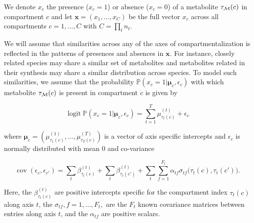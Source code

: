 \documentclass[
11pt, %
oneside, %
english, %
singlespacing, %
headsepline, %
chapterinoneline, %
]{MastersDoctoralThesis} %
\DeclareMathOperator{\logit}{logit}
\DeclareMathOperator{\cov}{cov}
\def\P{\mathbb{P}}
\def\x{\boldsymbol{x}}
\def\bmu{\boldsymbol{\mu}}
\def\M{{\cal M}}
\begin{document}
We denote $x_{c}$ the presence ($x_c=1$) or absence ($x_c=0$) of a metabolite $\tau_\M(c)$ in compartment $c$ and let $\x=(x_1, \ldots, x_C)$ be the full vector $x_c$ across all compartments $c=1, \ldots, C$ with $C=\prod_t n_t$.

We will assume that similarities across any of the axes of compartmentalization is reflected in the patterns of presences and absences in $\x$. For instance, closely related species may share a similar set of metabolites and  metabolites related in their synthesis may share a similar distribution across species. To model such similarities, we assume that the probability $\P(x_c=1|\bmu_c, \epsilon_c)$ with which metabolite $\tau_\M(c)$ is present in compartment $c$ is given by

\begin{equation}\label{eq:logit of X}
	\logit \P(x_c=1|\bmu_c, \epsilon_c) = \sum_{t=1}^{T} \mu^{(t)}_{\tau_t(c)} + \epsilon_{c}
\end{equation}

where $\bmu_c=(\mu^{(1)}_{\tau_1(c)}, \ldots, \mu^{(T)}_{\tau_T(c)})$ is a vector of axis specific intercepts and $\epsilon_{c}$ is normally distributed with mean 0 and co-variance

\begin{equation}
	\cov(\epsilon_c, \epsilon_{c'}) = \sum_t \beta^{(t)}_{\tau_t(c)} + \sum_t \beta^{(t)}_{\tau_t(c')} + \sum_t \sum_{f=1}^{F_t} \alpha_{tf} \sigma_{tf}\Big(\tau_t(c), \tau_t(c')\Big).
\end{equation}

Here, the $\beta^{(t)}_{\tau_t(c)}$ are positive intercepts specific for the compartment index $\tau_t(c)$ along axis $t$, the $\sigma_{tf}, f=1, \ldots, F_t,$ are the $F_t$ known covariance matrices between entries along axis $t$, and the $\alpha_{tf}$ are positive scalars.
\end{document}
